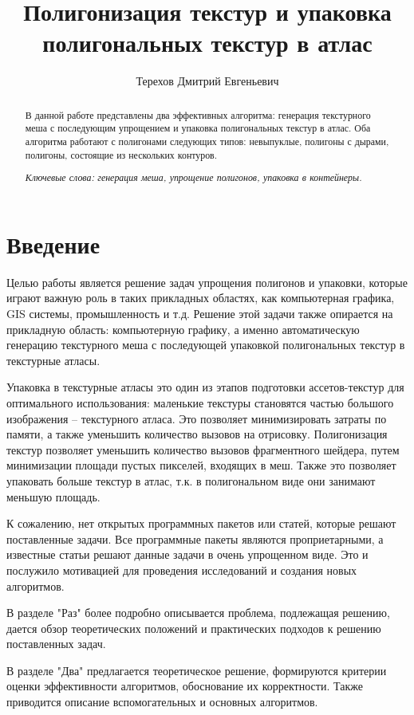 \documentclass{fefu_thesis/cls/fefu}
\author{Терехов Дмитрий Евгеньевич}
\title{Полигонизация текстур и упаковка полигональных текстур в атлас}
\begin{document}
    \begin{abstract}
        В данной работе представлены два эффективных алгоритма: генерация текстурного меша с последующим упрощением и упаковка полигональных текстур в атлас. Оба алгоритма работают с полигонами следующих типов: невыпуклые, полигоны с дырами, полигоны, состоящие из нескольких контуров.

        \textit{Ключевые слова: генерация меша, упрощение полигонов, упаковка в контейнеры.}
    \end{abstract}
    \pagebreak
    \tableofcontents
    \pagebreak
    {\centering\section*{Введение}}
    Целью работы является решение задач упрощения полигонов и упаковки, которые играют важную роль в таких прикладных областях, как компьютерная графика, GIS системы, промышленность и т.д. Решение этой задачи также опирается на прикладную область: компьютерную графику, а именно автоматическую генерацию текстурного меша с последующей упаковкой полигональных текстур в текстурные атласы.

    Упаковка в текстурные атласы это один из этапов подготовки ассетов-текстур для оптимального использования: маленькие текстуры становятся частью большого изображения -- текстурного атласа. Это позволяет минимизировать затраты по памяти, а также уменьшить количество вызовов на отрисовку. Полигонизация текстур позволяет уменьшить количество вызовов фрагментного шейдера, путем минимизации площади пустых пикселей, входящих в меш. Также это позволяет упаковать больше текстур в атлас, т.к. в полигональном виде они занимают меньшую площадь.

    К сожалению, нет открытых программных пакетов или статей, которые решают поставленные задачи. Все программные пакеты являются проприетарными, а известные статьи решают данные задачи в очень упрощенном виде. Это и послужило мотивацией для проведения исследований и создания новых алгоритмов.

    В разделе "Раз" более подробно описывается проблема, подлежащая решению, дается обзор теоретических положений и практических подходов к решению поставленных задач.

    В разделе "Два" предлагается теоретическое решение, формируются критерии оценки эффективности алгоритмов, обоснование их корректности. Также приводится описание вспомогательных и основных алгоритмов.
\end{document}
